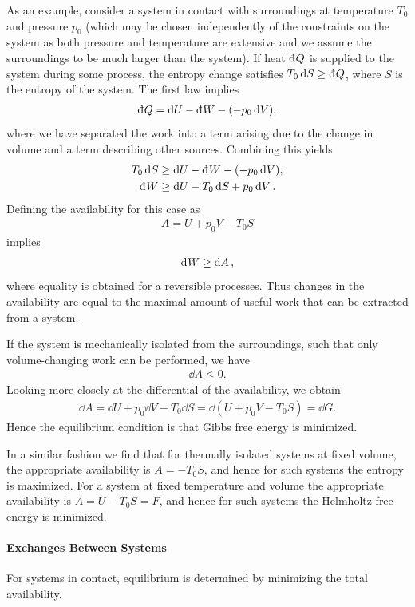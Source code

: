 As an example, consider a system in contact with surroundings at temperature $T_{0}$ and pressure $p_{0}$ (which may be chosen independently of the constraints on the system as both pressure and temperature are extensive and we assume the surroundings to be much larger than the system). If heat $\din{Q}$ is supplied to the system during some process, the entropy change satisfies $T_{0}\dd{S} \geq \din{Q}$, where $S$ is the entropy of the system. The first law implies
\begin{align*}
	\din{Q} = \dd{U} - \din{W} - (-p_{0}\dd{V}),
\end{align*}
where we have separated the work into a term arising due to the change in volume and a term describing other sources. Combining this yields
\begin{align*}
	T_{0}\dd{S} &\geq \dd{U} - \din{W} - (-p_{0}\dd{V}), \\
	\din{W}     &\geq \dd{U} - T_{0}\dd{S}  + p_{0}\dd{V}.
\end{align*}
Defining the availability for this case as
\begin{align*}
	A = U + p_{0}V - T_{0}S
\end{align*}
implies
\begin{align*}
	\din{W} \geq \dd{A},
\end{align*}
where equality is obtained for a reversible processes. Thus changes in the availability are equal to the maximal amount of useful work that can be extracted from a system.

If the system is mechanically isolated from the surroundings, such that only volume-changing work can be performed, we have
\begin{align*}
	\dd{A} \leq 0.
\end{align*}
Looking more closely at the differential of the availability, we obtain
\begin{align*}
	\dd{A} = \dd{U} + p_{0}\dd{V} - T_{0}\dd{S} = \dd(U + p_{0}V - T_{0}S) = \dd{G}.
\end{align*}
Hence the equilibrium condition is that Gibbs free energy is minimized.

In a similar fashion we find that for thermally isolated systems at fixed volume, the appropriate availability is $A = -T_{0}S$, and hence for such systems the entropy is maximized. For a system at fixed temperature and volume the appropriate availability is $A = U - T_{0}S = F$, and hence for such systems the Helmholtz free energy is minimized.

\paragraph{Exchanges Between Systems}
For systems in contact, equilibrium is determined by minimizing the total availability.

